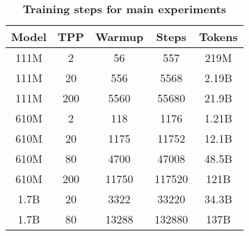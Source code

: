 \begin{table}
  \centering
  \caption{\textbf{Training steps for main experiments}\label{tab:train_steps}}
\begin{tabular}{@{}ccccc@{}}
\toprule
Model & TPP & Warmup & Steps  & Tokens \\ \midrule
111M  & 2   & 56     & 557    & 219M   \\
111M  & 20  & 556    & 5568   & 2.19B  \\
111M  & 200 & 5560   & 55680  & 21.9B  \\
610M  & 2   & 118    & 1176   & 1.21B  \\
610M  & 20  & 1175   & 11752  & 12.1B  \\
610M  & 80  & 4700   & 47008  & 48.5B   \\
610M  & 200 & 11750  & 117520 & 121B   \\
1.7B  & 20  & 3322   & 33220  & 34.3B  \\
1.7B  & 80  & 13288  & 132880 & 137B  \\ \bottomrule
\end{tabular}
\end{table}
